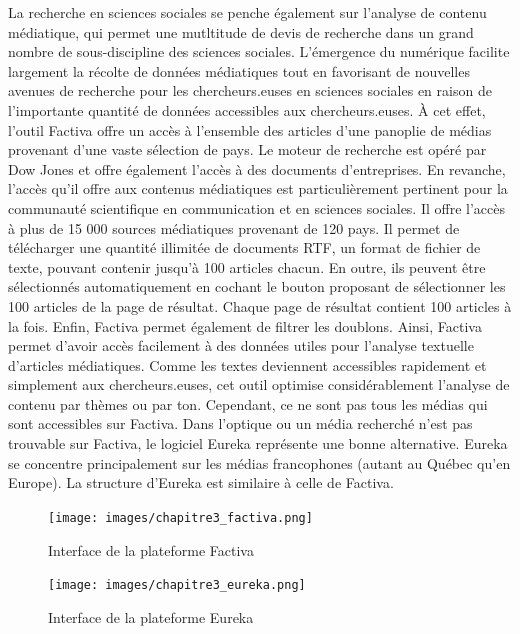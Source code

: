 \documentclass[
  letterpaper,
  DIV=11,
  numbers=noendperiod]{scrreprt}
\begin{document}
La recherche en sciences sociales se penche également sur l'analyse de
contenu médiatique, qui permet une mutltitude de devis de recherche dans
un grand nombre de sous-discipline des sciences sociales. L'émergence du
numérique facilite largement la récolte de données médiatiques tout en
favorisant de nouvelles avenues de recherche pour les chercheurs.euses
en sciences sociales en raison de l'importante quantité de données
accessibles aux chercheurs.euses. À cet effet, l'outil Factiva offre un
accès à l'ensemble des articles d'une panoplie de médias provenant d'une
vaste sélection de pays. Le moteur de recherche est opéré par Dow Jones
et offre également l'accès à des documents d'entreprises. En revanche,
l'accès qu'il offre aux contenus médiatiques est particulièrement
pertinent pour la communauté scientifique en communication et en
sciences sociales. Il offre l'accès à plus de 15 000 sources médiatiques
provenant de 120 pays. Il permet de télécharger une quantité illimitée
de documents RTF, un format de fichier de texte, pouvant contenir
jusqu'à 100 articles chacun. En outre, ils peuvent être sélectionnés
automatiquement en cochant le bouton proposant de sélectionner les 100
articles de la page de résultat. Chaque page de résultat contient 100
articles à la fois. Enfin, Factiva permet également de filtrer les
doublons. Ainsi, Factiva permet d'avoir accès facilement à des données
utiles pour l'analyse textuelle d'articles médiatiques. Comme les textes
deviennent accessibles rapidement et simplement aux chercheurs.euses,
cet outil optimise considérablement l'analyse de contenu par thèmes ou
par ton. Cependant, ce ne sont pas tous les médias qui sont accessibles
sur Factiva. Dans l'optique ou un média recherché n'est pas trouvable
sur Factiva, le logiciel Eureka représente une bonne alternative. Eureka
se concentre principalement sur les médias francophones (autant au
Québec qu'en Europe). La structure d'Eureka est similaire à celle de
Factiva.

\begin{figure}

{\centering \texttt{[image: images/chapitre3\_factiva.png]}

}

\caption{Interface de la plateforme Factiva}

\end{figure}

\begin{figure}

{\centering \texttt{[image: images/chapitre3\_eureka.png]}

}

\caption{Interface de la plateforme Eureka}

\end{figure}
\end{document}
